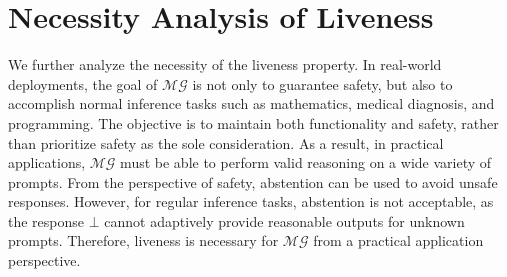 \section{Necessity Analysis of Liveness}
We further analyze the necessity of the liveness property. In real-world deployments, the goal of $\mathcal{MG}$ is not only to guarantee safety, but also to accomplish normal inference tasks such as mathematics, medical diagnosis, and programming. The objective is to maintain both functionality and safety, rather than prioritize safety as the sole consideration. As a result, in practical applications, $\mathcal{MG}$ must be able to perform valid reasoning on a wide variety of prompts. From the perspective of safety, abstention can be used to avoid unsafe responses. However, for regular inference tasks, abstention is not acceptable, as the response $\bot$ cannot adaptively provide reasonable outputs for unknown prompts. Therefore, liveness is necessary for $\mathcal{MG}$ from a practical application perspective. 